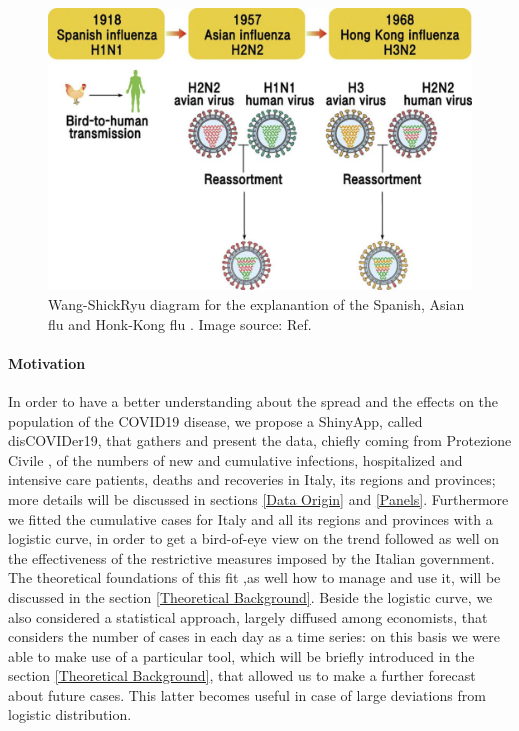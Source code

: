 \documentclass[
12pt, %
a4paper, %
oneside, %
headinclude,footinclude, %
BCOR5mm, %
]{scrartcl}
\begin{document}
\begin{figure}[h]
 \centering
 \includegraphics[width=0.8\linewidth]{Figures/Mixing_Flu.jpg} 
 \caption{Wang-ShickRyu diagram for the explanantion of the Spanish, Asian flu and Honk-Kong flu .  Image source: Ref.  \cite{RYU2017195}}
 \label{Mixing_Flu}
\end{figure}




\paragraph{Motivation} \label{Motivation}
In order to have a better understanding about the spread and the effects on the population of the COVID19 disease, we propose a ShinyApp, called disCOVIDer19, that gathers and present the data, chiefly coming from Protezione Civile \cite{protezionecivile+git}, of the numbers of new and cumulative infections, hospitalized and intensive care patients, deaths and recoveries in Italy, its regions and provinces; more details will be discussed in sections \ref{Data Origin} and \ref{Panels}. Furthermore we fitted the cumulative cases for Italy and all its regions and provinces with a logistic curve, in order to get a bird-of-eye view on the trend followed as well on the effectiveness of the restrictive measures imposed by the Italian government. The theoretical foundations of this fit ,as well how to manage and use it, will be discussed in the section \ref{Theoretical Background}. Beside the logistic curve, we also considered a statistical approach, largely diffused among economists, that considers the number of cases in each day as a time series: on this basis we were able to make use of a particular tool, which will be briefly introduced in the section \ref{Theoretical Background}, that allowed us to  make a further forecast  about future cases.  This latter becomes useful in case of large deviations from logistic distribution. 
 
\end{document}
